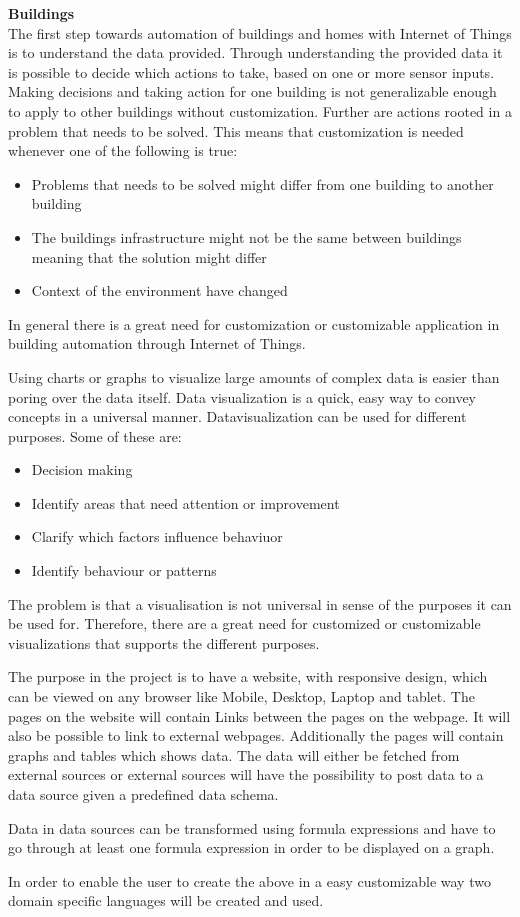 \textbf{Buildings}\\
The first step towards automation of buildings and homes with Internet of Things is to
understand the data provided. 
Through understanding the provided data it is possible to decide which actions to take, based on
one or more sensor inputs. 
Making decisions and taking action for one building is not generalizable enough to apply to
other buildings without customization. 
Further are actions rooted in a problem that needs to be solved. 
This means that customization is needed whenever one of the following is true:
\begin{itemize}
\item Problems that needs to be solved might differ from one building to another building
\item The buildings infrastructure might not be the same between buildings meaning that the solution might differ
\item Context of the environment have changed
\end{itemize}

In general there is a great need for customization or customizable application in building
automation through Internet of Things.

Using charts or graphs to visualize large amounts of complex data is easier than poring over
the data itself. 
Data visualization is a quick, easy way to convey concepts in a universal manner.
Datavisualization can be used for different purposes. 
Some of these are:
\begin{itemize}
\item Decision making
\item Identify areas that need attention or improvement
\item Clarify which factors influence behaviuor
\item Identify behaviour or patterns
\end{itemize}

The problem is that a visualisation is not universal in sense of the purposes it can be used for. 
Therefore, there are a great need for customized or customizable visualizations that supports
the different purposes. 

The purpose in the project is to have a website, with responsive design, which can be viewed on any browser like Mobile, Desktop, Laptop and tablet. 
The pages on the website will contain Links between the pages on the webpage. 
It will also be possible to link to external webpages. 
Additionally the pages will contain graphs and tables which shows data. 
The data will either be fetched from external sources or external sources will have the
possibility to post data to a data source given a predefined data schema. 

Data in data sources can be transformed using formula expressions and have to go through at
least one formula expression in order to be displayed on a graph.  


In order to enable the user to create the above in a easy customizable way two domain specific
languages will be created and used.


